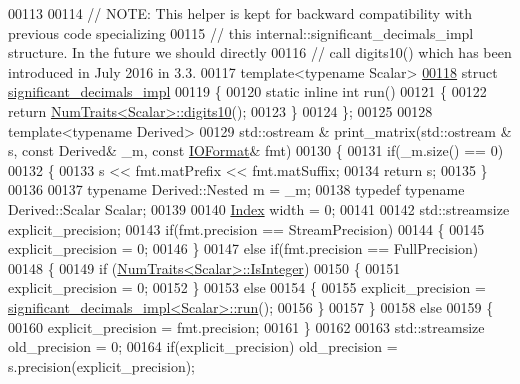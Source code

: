 \begin{DoxyCode}
00113 
00114 \textcolor{comment}{// NOTE: This helper is kept for backward compatibility with previous code specializing}
00115 \textcolor{comment}{//       this internal::significant\_decimals\_impl structure. In the future we should directly}
00116 \textcolor{comment}{//       call digits10() which has been introduced in July 2016 in 3.3.}
00117 \textcolor{keyword}{template}<\textcolor{keyword}{typename} Scalar>
\hyperlink{struct_eigen_1_1internal_1_1significant__decimals__impl}{00118} \textcolor{keyword}{struct }\hyperlink{struct_eigen_1_1internal_1_1significant__decimals__impl}{significant\_decimals\_impl}
00119 \{
00120   \textcolor{keyword}{static} \textcolor{keyword}{inline} \textcolor{keywordtype}{int} run()
00121   \{
00122     \textcolor{keywordflow}{return} \hyperlink{group___core___module_struct_eigen_1_1_num_traits}{NumTraits<Scalar>::digits10}();
00123   \}
00124 \};
00125 
00128 \textcolor{keyword}{template}<\textcolor{keyword}{typename} Derived>
00129 std::ostream & print\_matrix(std::ostream & s, \textcolor{keyword}{const} Derived& \_m, \textcolor{keyword}{const} \hyperlink{group___core___module_struct_eigen_1_1_i_o_format}{IOFormat}& fmt)
00130 \{
00131   \textcolor{keywordflow}{if}(\_m.size() == 0)
00132   \{
00133     s << fmt.matPrefix << fmt.matSuffix;
00134     \textcolor{keywordflow}{return} s;
00135   \}
00136   
00137   \textcolor{keyword}{typename} Derived::Nested m = \_m;
00138   \textcolor{keyword}{typedef} \textcolor{keyword}{typename} Derived::Scalar Scalar;
00139 
00140   \hyperlink{namespace_eigen_a62e77e0933482dafde8fe197d9a2cfde}{Index} width = 0;
00141 
00142   std::streamsize explicit\_precision;
00143   \textcolor{keywordflow}{if}(fmt.precision == StreamPrecision)
00144   \{
00145     explicit\_precision = 0;
00146   \}
00147   \textcolor{keywordflow}{else} \textcolor{keywordflow}{if}(fmt.precision == FullPrecision)
00148   \{
00149     \textcolor{keywordflow}{if} (\hyperlink{group___core___module_struct_eigen_1_1_num_traits}{NumTraits<Scalar>::IsInteger})
00150     \{
00151       explicit\_precision = 0;
00152     \}
00153     \textcolor{keywordflow}{else}
00154     \{
00155       explicit\_precision = \hyperlink{struct_eigen_1_1internal_1_1significant__decimals__impl}{significant\_decimals\_impl<Scalar>::run}();
00156     \}
00157   \}
00158   \textcolor{keywordflow}{else}
00159   \{
00160     explicit\_precision = fmt.precision;
00161   \}
00162 
00163   std::streamsize old\_precision = 0;
00164   \textcolor{keywordflow}{if}(explicit\_precision) old\_precision = s.precision(explicit\_precision);

\end{DoxyCode}
